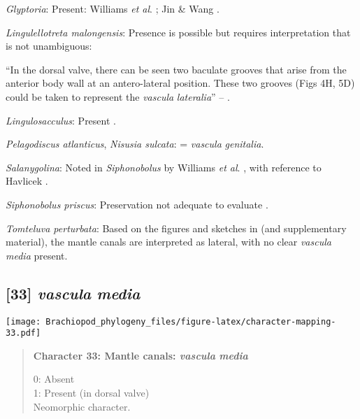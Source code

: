 \documentclass[openany]{book}
\theoremstyle{definition}
\theoremstyle{definition}
\theoremstyle{definition}
\theoremstyle{remark}
\begin{document}
\hypertarget{Glyptoria-coding-32}{}
\emph{Glyptoria}: Present: Williams \emph{et al}.
\citeyearpar{Williams2000LinguliformeaCraniiformea}; Jin \& Wang
\citeyearpar{Jin1992Revisionof}.

\hypertarget{Lingulellotreta_malongensis-coding-32}{}
\emph{Lingulellotreta malongensis}: Presence is possible but requires
interpretation that is not unambiguous:

``In the dorsal valve, there can be seen two baculate grooves that arise
from the\\
anterior body wall at an antero-lateral position. These two grooves
(Figs 4H, 5D) could be taken to represent the \emph{vascula}
\emph{lateralia}'' -- \citet{Zhang2007Agregarious}.

\hypertarget{Lingulosacculus-coding-32}{}
\emph{Lingulosacculus}: Present
\citep{Williams2000LinguliformeaCraniiformea}.

\hypertarget{Nisusia_sulcata-coding-32}{}
\emph{Pelagodiscus atlanticus}, \emph{Nisusia sulcata}: = \emph{vascula}
\emph{genitalia}.

\hypertarget{Salanygolina-coding-32}{}
\emph{Salanygolina}: Noted in \emph{Siphonobolus} by Williams \emph{et
al}. \citeyearpar{Williams2000LinguliformeaCraniiformea}, with reference
to Havlicek \citeyearpar{Havlicek1982LingulaceaPaterinacea}.

\hypertarget{Siphonobolus_priscus-coding-32}{}
\emph{Siphonobolus priscus}: Preservation not adequate to evaluate
\citep{Streng2016Anew}.

\hypertarget{Tomteluva_perturbata-coding-32}{}
\emph{Tomteluva perturbata}: Based on the figures and sketches in
\citet{Zhang2014Anearly} (and supplementary material), the mantle canals
are interpreted as lateral, with no clear \emph{vascula} \emph{media}
present.

\subsection*{\texorpdfstring{{[}33{]} \emph{vascula}
\emph{media}}{{[}33{]} vascula media}}\label{vascula-media}

\texttt{[image: Brachiopod\_phylogeny\_files/figure-latex/character-mapping-33.pdf]}

\begin{quote}
\textbf{Character 33: Mantle canals: \emph{vascula} \emph{media}}

0: Absent\\
1: Present (in dorsal valve)\\
Neomorphic character.
\end{quote}
\end{document}
